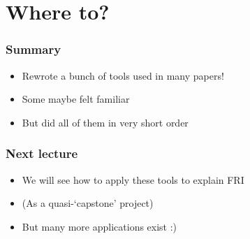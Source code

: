 \documentclass{beamer}
\newcommand{\field}{\mathbf{F}}
\begin{document}

    \section{Where to?}
    \begin{frame}
        \frametitle{Summary}
        \begin{itemize}\itemsep=12pt
            \item Rewrote a bunch of tools used in many papers!
            \item Some maybe felt familiar
            \item But did all of them in very short order
        \end{itemize}
    \end{frame}

    \begin{frame}
        \frametitle{Next lecture}
        \begin{itemize}\itemsep=12pt
            \item We will see how to apply these tools to explain FRI
            \item (As a quasi-`capstone' project)
            \item But many more applications exist :)
        \end{itemize}
    \end{frame}
\end{document}
